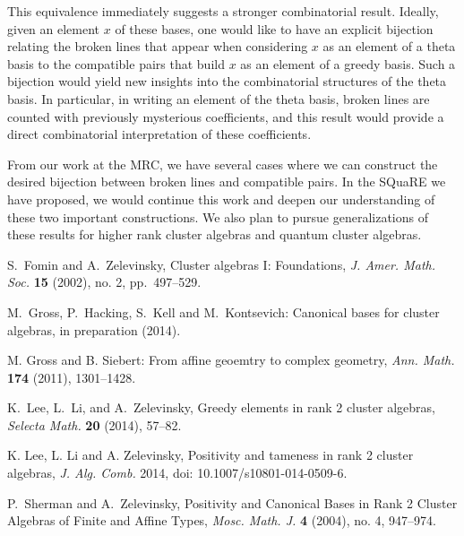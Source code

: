 \documentclass{amsart}
\begin{document}
    This equivalence immediately suggests a stronger combinatorial result.
    Ideally, given an element $x$ of these bases, one would like to have an
    explicit bijection relating the broken lines that appear when considering
    $x$ as an element of a theta basis to the compatible pairs that build $x$ as
    an element of a greedy basis.
    Such a bijection would yield new insights into the combinatorial structures
    of the theta basis.
    In particular, in writing an element of the theta basis, broken lines are
    counted with previously mysterious coefficients, and this result would
    provide a direct combinatorial interpretation of these coefficients.
    
    From our work at the MRC, we have several cases where we can construct the
    desired bijection between broken lines and compatible pairs.
    In the SQuaRE we have proposed, we would continue this work and deepen our
    understanding of these two important constructions.
    We also plan to pursue generalizations of these results for higher rank
    cluster algebras and quantum cluster algebras.

  \begin{thebibliography}{XXX}
      S.~Fomin and A.~Zelevinsky, Cluster algebras I: Foundations,
      \textsl{J. Amer. Math. Soc.} \textbf{15} (2002), no. 2, pp.~497--529.

      M.~Gross, P.~Hacking, S.~Kell and M.~Kontsevich: Canonical bases for
      cluster algebras, in preparation (2014).

      M. Gross and B. Siebert: From affine geoemtry to complex geometry,
      \textsl{Ann. Math.} \textbf{174} (2011), 1301--1428.

      K.~Lee, L.~Li, and A.~Zelevinsky, Greedy elements in rank 2 cluster
      algebras, \textsl{Selecta Math.} \textbf{20} (2014), 57--82.

      K. Lee, L. Li and A. Zelevinsky, Positivity and tameness in rank 2 cluster
      algebras, \textsl{J. Alg. Comb.} 2014, doi: 10.1007/s10801-014-0509-6.

      P.~Sherman and A.~Zelevinsky, Positivity and Canonical Bases in Rank 2
      Cluster Algebras of Finite and Affine Types, \textsl{Mosc. Math. J.}
      \textbf{4} (2004), no. 4, 947--974.

  \end{thebibliography}
\end{document}
